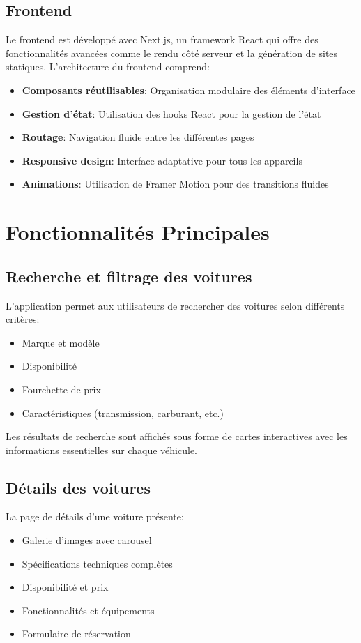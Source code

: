 \documentclass[12pt,a4paper]{report}
\begin{document}
\section{Frontend}
Le frontend est développé avec Next.js, un framework React qui offre des fonctionnalités avancées comme le rendu côté serveur et la génération de sites statiques. L'architecture du frontend comprend:

\begin{itemize}
    \item \textbf{Composants réutilisables}: Organisation modulaire des éléments d'interface
    \item \textbf{Gestion d'état}: Utilisation des hooks React pour la gestion de l'état
    \item \textbf{Routage}: Navigation fluide entre les différentes pages
    \item \textbf{Responsive design}: Interface adaptative pour tous les appareils
    \item \textbf{Animations}: Utilisation de Framer Motion pour des transitions fluides
\end{itemize}

\chapter{Fonctionnalités Principales}
\section{Recherche et filtrage des voitures}
L'application permet aux utilisateurs de rechercher des voitures selon différents critères:
\begin{itemize}
    \item Marque et modèle
    \item Disponibilité
    \item Fourchette de prix
    \item Caractéristiques (transmission, carburant, etc.)
\end{itemize}

Les résultats de recherche sont affichés sous forme de cartes interactives avec les informations essentielles sur chaque véhicule.

\section{Détails des voitures}
La page de détails d'une voiture présente:
\begin{itemize}
    \item Galerie d'images avec carousel
    \item Spécifications techniques complètes
    \item Disponibilité et prix
    \item Fonctionnalités et équipements
    \item Formulaire de réservation
\end{itemize}
\end{document}
